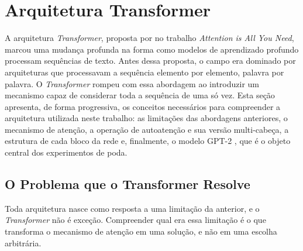 
\section{Arquitetura Transformer}\label{sec:transformer}

A arquitetura \textit{Transformer}, proposta por  no trabalho
\textit{Attention is All You Need}, marcou uma mudança profunda na forma como modelos
de aprendizado profundo processam sequências de texto. Antes dessa proposta, o campo
era dominado por arquiteturas que processavam a sequência elemento por elemento, palavra
por palavra. O \textit{Transformer} rompeu com essa abordagem ao introduzir um mecanismo
capaz de considerar toda a sequência de uma só vez. Esta seção apresenta, de forma
progressiva, os conceitos necessários para compreender a arquitetura utilizada neste
trabalho: as limitações das abordagens anteriores, o mecanismo de atenção, a operação
de autoatenção e sua versão multi-cabeça, a estrutura de cada bloco da rede e,
finalmente, o modelo GPT-2 \cite{Radford2019}, que é o objeto central dos experimentos de poda.


\subsection{O Problema que o Transformer Resolve}\label{subsec:limitacoes_rnn}

Toda arquitetura nasce como resposta a uma limitação da anterior, e o \textit{Transformer}
não é exceção. Compreender qual era essa limitação é o que transforma o mecanismo de
atenção em uma solução, e não em uma escolha arbitrária.

